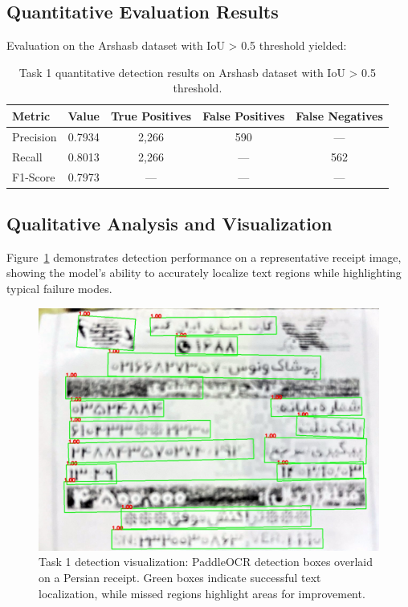 \documentclass[11pt,a4paper]{article}
\begin{document}
\subsection{Quantitative Evaluation Results}
Evaluation on the Arshasb dataset with IoU > 0.5 threshold yielded:

\begin{table}[h]
  \centering
  \begin{tabular*}{\textwidth}{@{\extracolsep{\fill}}lcccc@{}}
    \toprule
    Metric & Value & True Positives & False Positives & False Negatives \\
    \midrule
    Precision & 0.7934 & 2,266 & 590 & --- \\
    Recall & 0.8013 & 2,266 & --- & 562 \\
    F1-Score & 0.7973 & --- & --- & --- \\
    \bottomrule
  \end{tabular*}
  \caption{Task 1 quantitative detection results on Arshasb dataset with IoU > 0.5 threshold.}
  \label{tab:task1-metrics}
\end{table}

\subsection{Qualitative Analysis and Visualization}
Figure~\ref{fig:task1-detection} demonstrates detection performance on a representative receipt image, showing the model's ability to accurately localize text regions while highlighting typical failure modes.

\begin{figure}[h]
  \centering
  \includegraphics[width=0.7\linewidth]{figures/task1_detection_overlay.jpg}
  \caption{Task 1 detection visualization: PaddleOCR detection boxes overlaid on a Persian receipt. Green boxes indicate successful text localization, while missed regions highlight areas for improvement.}
  \label{fig:task1-detection}
\end{figure}
\end{document}

